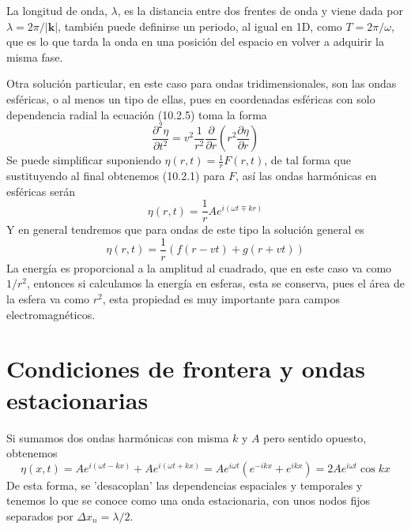 La longitud de onda, $\lambda$, es la distancia entre dos frentes de onda y viene dada por $\lambda = 2\pi/|\mathbf{k}|$, también puede definirse un periodo, al igual en 1D, como $T = 2\pi/\omega$, que es lo que tarda la onda en una posición del espacio en volver a adquirir la misma fase.

Otra solución particular, en este caso para ondas tridimensionales, son las ondas esféricas, o al menos un tipo de ellas, pues en coordenadas esféricas con solo dependencia radial la ecuación (10.2.5) toma la forma
\begin{equation} \label{6.1.1}
    \frac{\partial^2 \eta}{\partial t^2} = v^2 \frac{1}{r^2}\frac{\partial}{\partial r}\left(r^2 \frac{\partial \eta}{\partial r}\right)
\end{equation}
Se puede simplificar suponiendo $\eta(r,t) = \frac{1}{r} F(r,t)$, de tal forma que sustituyendo al final obtenemos (10.2.1) para $F$, así las ondas harmónicas en esféricas serán
\begin{equation} \label{6.1.1}
    \eta(r,t) = \frac{1}{r}A e^{i(\omega t \mp kr)}
\end{equation}
Y en general tendremos que para ondas de este tipo la solución general es
\begin{equation} \label{6.1.1}
    \eta(r,t) = \frac{1}{r}\left(f(r-vt) + g(r+vt)\right)
\end{equation}
La energía es proporcional a la amplitud al cuadrado, que en este caso va como $1/r^2$, entonces si calculamos la energía en esferas, esta se conserva, pues el área de la esfera va como $r^2$, esta propiedad es muy importante para campos electromagnéticos.

\section{Condiciones de frontera y ondas estacionarias}
Si sumamos dos ondas harmónicas con misma $k$ y $A$ pero sentido opuesto, obtenemos 
\begin{equation} \label{6.1.1}
    \eta(x,t) = Ae^{i(\omega t - kx)}+Ae^{i(\omega t + kx)} = A e^{i\omega t}(e^{-ikx}+e^{ikx}) = 2A e^{i\omega t} \cos{kx}
\end{equation}
De esta forma, se 'desacoplan' las dependencias espaciales y temporales y tenemos lo que se conoce como una onda estacionaria, con unos nodos fijos separados por $\Delta x_n = \lambda/2$.

